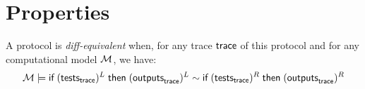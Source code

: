 \section{Properties}

\begin{definition}
  A protocol is \emph{diff-equivalent} when, for any trace $\textsf{trace}$ of this protocol and for any computational model $\mathcal{M}$, we have:
  $$\mathcal{M} \models \textsf{if}\; (\textsf{tests}_{\textsf{trace}})^L \;\textsf{then}\; (\textsf{outputs}_{\textsf{trace}})^L \sim \textsf{if}\; (\textsf{tests}_{\textsf{trace}})^R \;\textsf{then}\; (\textsf{outputs}_{\textsf{trace}})^R$$
\end{definition}


%
%
